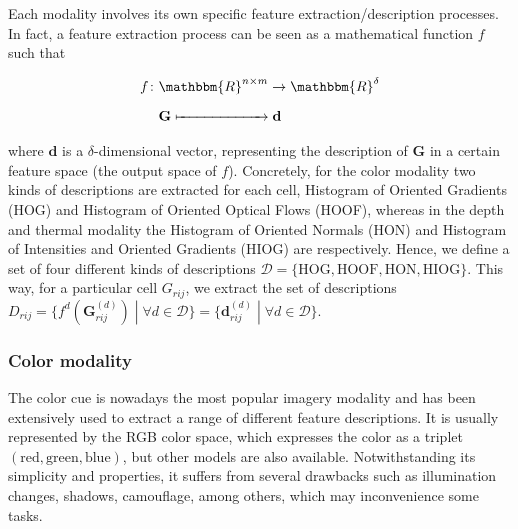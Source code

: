 \documentclass[10pt,twocolumn,letterpaper]{article}
\begin{document}
Each modality involves its own specific feature extraction/description processes. In fact, a feature extraction process can be seen as a mathematical function $f$ such that

\begin{align}
\begin{split}
f \colon & \mathbbm{R}^{n \times m} \to \mathbbm{R}^\delta \\
& \mathbf{G} \xmapsto{\phantom{\mathbbm{R}^{n \times m}}} \mathbf{d}
\end{split}
\end{align}

where $\mathbf{d}$ is a $\delta$-dimensional vector, representing the description of $\mathbf{G}$ in a certain feature space (the output space of $f$). Concretely, for the color modality two kinds of descriptions are extracted for each cell, Histogram of Oriented Gradients (HOG) and Histogram of Oriented Optical Flows (HOOF), whereas in the depth and thermal modality the Histogram of Oriented Normals (HON) and Histogram of Intensities and Oriented Gradients (HIOG) are respectively. Hence, we define a set of four different kinds of descriptions $\mathcal{D} = \{\mathrm{HOG}, \mathrm{HOOF}, \mathrm{HON}, \mathrm{HIOG}\}$. This way, for a particular cell $G_{rij}$, we extract the set of descriptions $D_{rij} = \{f^d(\mathbf{G}_{rij}^{(d)}) \;|\; \forall d \in \mathcal{D}\} = \{\mathbf{d}_{rij}^{(d)} \;|\; \forall d \in \mathcal{D}\}$.

\subsubsection{Color modality}
\label{sssec:color}

The color cue is nowadays the most popular imagery modality and has been extensively used to extract a range of different feature descriptions. It is usually represented by the RGB color space, which expresses the color as a triplet $(\text{red}, \text{green}, \text{blue})$, but other models are also available. Notwithstanding its simplicity and properties, it suffers from several drawbacks such as illumination changes, shadows, camouflage, among others, which may inconvenience some tasks.
\end{document}

